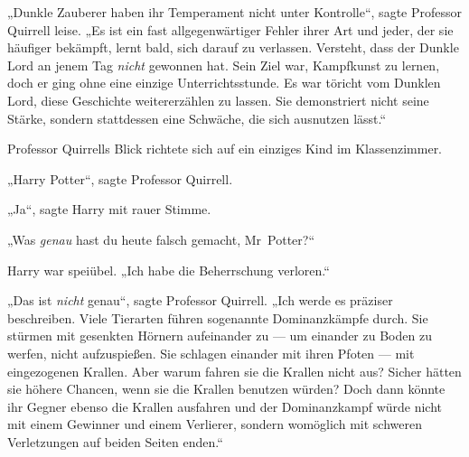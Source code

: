 „Dunkle Zauberer haben ihr Temperament nicht unter Kontrolle“, sagte Professor Quirrell leise.
„Es ist ein fast allgegenwärtiger Fehler ihrer Art und jeder, der sie häufiger bekämpft, lernt bald, sich darauf zu verlassen. Versteht, dass der Dunkle Lord an jenem Tag \emph{nicht} gewonnen hat. Sein Ziel war, Kampfkunst zu lernen, doch er ging ohne eine einzige Unterrichtsstunde. Es war töricht vom Dunklen Lord, diese Geschichte weitererzählen zu lassen. Sie demonstriert nicht seine Stärke, sondern stattdessen eine Schwäche, die sich ausnutzen lässt.“

Professor Quirrells Blick richtete sich auf ein einziges Kind im Klassenzimmer.

„Harry Potter“, sagte Professor Quirrell.

„Ja“, sagte Harry mit rauer Stimme.

„Was \emph{genau} hast du heute falsch gemacht, Mr~Potter?“

Harry war speiübel.
„Ich habe die Beherrschung verloren.“

„Das ist \emph{nicht} genau“, sagte Professor Quirrell.
„Ich werde es präziser beschreiben. Viele Tierarten führen sogenannte Dominanzkämpfe durch. Sie stürmen mit gesenkten Hörnern aufeinander zu — um einander zu Boden zu werfen, nicht aufzuspießen. Sie schlagen einander mit ihren Pfoten — mit eingezogenen Krallen. Aber warum fahren sie die Krallen nicht aus? Sicher hätten sie höhere Chancen, wenn sie die Krallen benutzen würden? Doch dann könnte ihr Gegner ebenso die Krallen ausfahren und der Dominanzkampf würde nicht mit einem Gewinner und einem Verlierer, sondern womöglich mit schweren Verletzungen auf beiden Seiten enden.“


